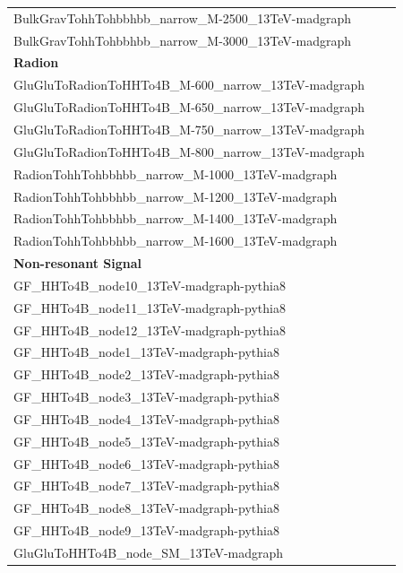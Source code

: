 \begin{table}[htb]
\begin{center}
\begin{tabular}{|l|c|c}
      {BulkGravTohhTohbbhbb\_narrow\_M-2500\_13TeV-madgraph} \\
      {BulkGravTohhTohbbhbb\_narrow\_M-3000\_13TeV-madgraph} \\
      \hline
      \textbf{Radion} \\ 
      \hline
      {GluGluToRadionToHHTo4B\_M-600\_narrow\_13TeV-madgraph}  \\
      {GluGluToRadionToHHTo4B\_M-650\_narrow\_13TeV-madgraph} \\
      {GluGluToRadionToHHTo4B\_M-750\_narrow\_13TeV-madgraph} \\
      {GluGluToRadionToHHTo4B\_M-800\_narrow\_13TeV-madgraph}  \\
      {RadionTohhTohbbhbb\_narrow\_M-1000\_13TeV-madgraph} \\
      {RadionTohhTohbbhbb\_narrow\_M-1200\_13TeV-madgraph} \\
      {RadionTohhTohbbhbb\_narrow\_M-1400\_13TeV-madgraph} \\
      {RadionTohhTohbbhbb\_narrow\_M-1600\_13TeV-madgraph}  \\
      \hline
      \textbf{Non-resonant Signal} \\ 
      \hline
      GF\_HHTo4B\_node10\_13TeV-madgraph-pythia8\\
      GF\_HHTo4B\_node11\_13TeV-madgraph-pythia8\\
      GF\_HHTo4B\_node12\_13TeV-madgraph-pythia8\\
      GF\_HHTo4B\_node1\_13TeV-madgraph-pythia8\\
      GF\_HHTo4B\_node2\_13TeV-madgraph-pythia8\\
      GF\_HHTo4B\_node3\_13TeV-madgraph-pythia8\\
      GF\_HHTo4B\_node4\_13TeV-madgraph-pythia8\\
      GF\_HHTo4B\_node5\_13TeV-madgraph-pythia8\\
      GF\_HHTo4B\_node6\_13TeV-madgraph-pythia8\\
      GF\_HHTo4B\_node7\_13TeV-madgraph-pythia8\\
      GF\_HHTo4B\_node8\_13TeV-madgraph-pythia8\\
      GF\_HHTo4B\_node9\_13TeV-madgraph-pythia8\\
      GluGluToHHTo4B\_node\_SM\_13TeV-madgraph  \\

\end{tabular}
\end{center}
\end{table}
